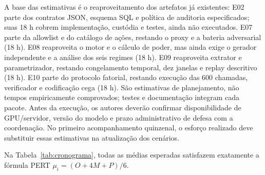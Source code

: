 \documentclass[12pt,openany,oneside,a4paper,english,brazilian,sumario=tradicional]{abntex2}
\begin{document}
A base das estimativas é o reaproveitamento dos artefatos já existentes: E02 parte dos contratos JSON, esquema SQL e política de auditoria especificados; suas 18 h cobrem implementação, custódia e testes, ainda não executados. E07 parte da allowlist e do catálogo de ações, restando o proxy e a bateria adversarial (18 h). E08 reaproveita o motor e o cálculo de poder, mas ainda exige o gerador independente e a análise dos seis regimes (18 h). E09 reaproveita extrator e parametrizador, restando congelamento temporal, dez janelas e replay descritivo (18 h). E10 parte do protocolo fatorial, restando execução das 600 chamadas, verificador e codificação cega (18 h). São estimativas de planejamento, não tempos empiricamente comprovados; testes e documentação integram cada pacote. Antes da execução, os autores deverão confirmar disponibilidade de GPU/servidor, versão do modelo e prazo administrativo de defesa com a coordenação. No primeiro acompanhamento quinzenal, o esforço realizado deve substituir essas estimativas na atualização dos cenários.

Na Tabela~\ref{tab:cronograma}, todas as médias esperadas satisfazem exatamente a fórmula PERT $\mu_i = (O + 4M + P)/6$.
\end{document}
